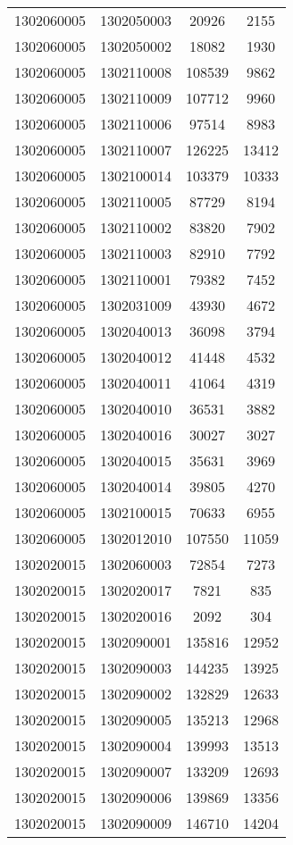 \begin{longtable}[h]{llcc}
		1302060005 & 1302050003 & 20926 & 2155\\
		1302060005 & 1302050002 & 18082 & 1930\\
		1302060005 & 1302110008 & 108539 & 9862\\
		1302060005 & 1302110009 & 107712 & 9960\\
		1302060005 & 1302110006 & 97514 & 8983\\
		1302060005 & 1302110007 & 126225 & 13412\\
		1302060005 & 1302100014 & 103379 & 10333\\
		1302060005 & 1302110005 & 87729 & 8194\\
		1302060005 & 1302110002 & 83820 & 7902\\
		1302060005 & 1302110003 & 82910 & 7792\\
		1302060005 & 1302110001 & 79382 & 7452\\
		1302060005 & 1302031009 & 43930 & 4672\\
		1302060005 & 1302040013 & 36098 & 3794\\
		1302060005 & 1302040012 & 41448 & 4532\\
		1302060005 & 1302040011 & 41064 & 4319\\
		1302060005 & 1302040010 & 36531 & 3882\\
		1302060005 & 1302040016 & 30027 & 3027\\
		1302060005 & 1302040015 & 35631 & 3969\\
		1302060005 & 1302040014 & 39805 & 4270\\
		1302060005 & 1302100015 & 70633 & 6955\\
		1302060005 & 1302012010 & 107550 & 11059\\
		1302020015 & 1302060003 & 72854 & 7273\\
		1302020015 & 1302020017 & 7821 & 835\\
		1302020015 & 1302020016 & 2092 & 304\\
		1302020015 & 1302090001 & 135816 & 12952\\
		1302020015 & 1302090003 & 144235 & 13925\\
		1302020015 & 1302090002 & 132829 & 12633\\
		1302020015 & 1302090005 & 135213 & 12968\\
		1302020015 & 1302090004 & 139993 & 13513\\
		1302020015 & 1302090007 & 133209 & 12693\\
		1302020015 & 1302090006 & 139869 & 13356\\
		1302020015 & 1302090009 & 146710 & 14204\\

\end{longtable}
